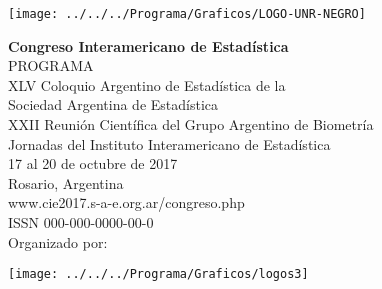 \documentclass[12pt,a4paper]{article}
\newcommand{\DocYear}{2017}
\newcommand{\DocPlace}{Rosario, Argentina}
\newcommand{\DocURL}{www.cie2017.s-a-e.org.ar/congreso.php}
\begin{document}
\thispagestyle{empty}
\setcounter{page}{1}
\vspace*{5 mm}
\begin{center} \setlength{\unitlength}{1cm}
  \texttt{[image: ../../../Programa/Graficos/LOGO-UNR-NEGRO]}
\end{center}
{\center
\vspace*{6 mm}
{\LARGE \bf Congreso Interamericano de Estadística} \\ [6mm]
{\Huge PROGRAMA}  \\ [10mm]
\vspace{2 mm}
{\large XLV Coloquio Argentino de Estadística de la\\Sociedad Argentina de Estadística} \\
{\large XXII Reunión Científica del Grupo Argentino de Biometría} \\
{\large Jornadas del Instituto Interamericano de Estadística} \\
\vspace{7 mm}
{\large 17 al 20 de octubre de 2017} \\[3mm]
{\large \DocPlace} \\[6mm]
{\large \DocURL}\\[6mm]
\vfill
{\large ISSN 000-000-0000-00-0}\\[6mm] 
{\Large Organizado por:} \\ [3mm]
}
\vspace{3 mm}
\begin{center} \setlength{\unitlength}{1cm}
  \texttt{[image: ../../../Programa/Graficos/logos3]}
\end{center}

\end{document}
